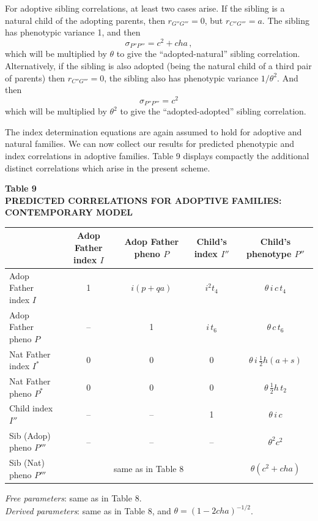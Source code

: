 ﻿\documentclass[12pt]{article}
\begin{document}
For adoptive sibling correlations, at least two cases arise. If the sibling is a natural child of the adopting parents, then $r_{G''G'''}=0$, but $r_{C''G'''}=a$. The sibling has phenotypic variance 1, and then
\begin{equation*}
\sigma_{P''P'''} = c^2+cha \, ,
\end{equation*}
which will be multiplied by $\theta$ to give the ``adopted-natural'' sibling correlation. Alternatively, if the sibling is also adopted (being the natural child of a third pair of parents) then $r_{C''G'''}=0$, the sibling also has phenotypic variance $1/\theta^2$. And then
\begin{equation*}
\sigma_{P''P'''} = c^2
\end{equation*}
which will be multiplied by $\theta^2$ to give the ``adopted-adopted'' sibling correlation.

The index determination equations are again assumed to hold for adoptive and natural families. We can now collect our results for predicted phenotypic and index correlations in adoptive families. Table 9 displays compactly the additional distinct correlations which arise in the present scheme.

\begin{center}
\textbf{Table 9}\\
\textbf{PREDICTED CORRELATIONS FOR ADOPTIVE FAMILIES: CONTEMPORARY MODEL}
\end{center}
\begin{center}
\small
\begin{tabular}{l c c c c}
\hline
 & Adop Father index $I$ & Adop Father pheno $P$ & Child's index $I''$ & Child's phenotype $P''$ \\
\hline
Adop Father index $I$ & 1 & $i(p+qa)$ & $i^2 t_4$ & $\theta\,i\,c\,t_4$ \\
Adop Father pheno $P$ & -- & 1 & $i\,t_6$ & $\theta\,c\,t_6$ \\
Nat Father index $I^*$ & 0 & 0 & 0 & $\theta\,i\,\tfrac12 h(a+s)$ \\
Nat Father pheno $P^*$ & 0 & 0 & 0 & $\theta\,\tfrac12 h\,t_2$ \\
Child index $I''$ & -- & -- & 1 & $\theta\,i\,c$ \\
Sib (Adop) pheno $P'''$ & -- & -- & -- & $\theta^2 c^2$ \\
Sib (Nat) pheno $P'''$ & \multicolumn{3}{c}{same as in Table 8} & $\theta(c^2+cha)$ \\
\hline
\end{tabular}
\end{center}
\emph{Free parameters}: same as in Table 8.\\
\emph{Derived parameters}: same as in Table 8, and $\theta = (1-2cha)^{-1/2}$.
\end{document}
